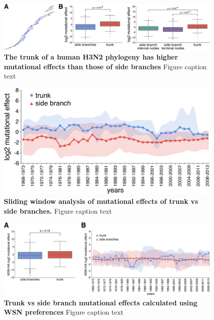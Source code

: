 \documentclass[11pt]{article}
\begin{document}
\begin{figure}
\centerline{\includegraphics[width=\textwidth]{figs/trunkvssidebranch/trunkvssidebranch.pdf}}
\caption{\label{fig:trunkvssidebranch}
{\bf The trunk of a human H3N2 phylogeny has higher mutational effects than those of side branches}
Figure caption text
}
\end{figure}

\begin{figure}
\centerline{\includegraphics[width=\textwidth]{figs/muteffects_sliding_window/muteffects_sliding_window.pdf}}
\caption{\label{fig:muteffects_sliding_window}
{\bf Sliding window analysis of mutational effects of trunk vs side branches.}
Figure caption text
}
\end{figure}

\begin{figure}
\centerline{\includegraphics[width=\textwidth]{figs/WSN_trunkvssidebranch/WSN_trunkvssidebranch.pdf}}
\caption{\label{fig:WSN_trunkvssidebranch}
{\bf Trunk vs side branch mutational effects calculated using WSN preferences}
Figure caption text
}
\end{figure}
\end{document}
